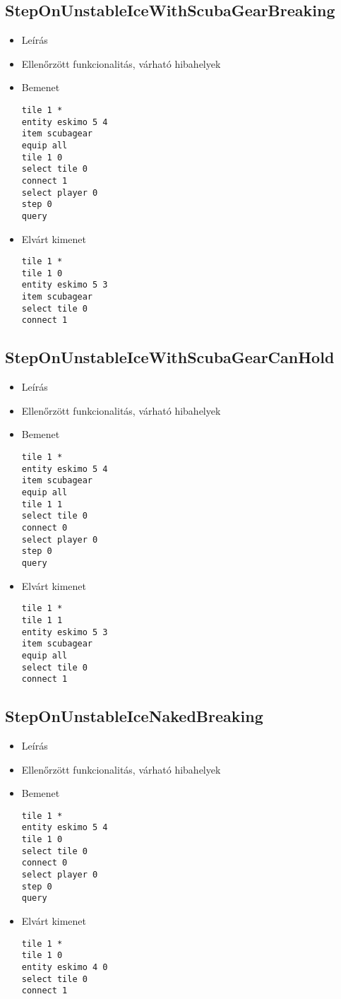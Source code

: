 \subsection{StepOnUnstableIceWithScubaGearBreaking}
\begin{itemize}
\item Leírás\newline
\item Ellenőrzött funkcionalitás, várható hibahelyek
\item Bemenet
\begin{lstlisting}
tile 1 *
entity eskimo 5 4
item scubagear
equip all
tile 1 0
select tile 0
connect 1
select player 0
step 0
query
\end{lstlisting}
\item Elvárt kimenet
\begin{lstlisting}
tile 1 *
tile 1 0
entity eskimo 5 3
item scubagear
select tile 0
connect 1
\end{lstlisting}
\end{itemize}

\subsection{StepOnUnstableIceWithScubaGearCanHold}
\begin{itemize}
\item Leírás\newline
\item Ellenőrzött funkcionalitás, várható hibahelyek
\item Bemenet
\begin{lstlisting}
tile 1 *
entity eskimo 5 4
item scubagear
equip all
tile 1 1
select tile 0
connect 0
select player 0
step 0
query
\end{lstlisting}
\item Elvárt kimenet
\begin{lstlisting}
tile 1 *
tile 1 1
entity eskimo 5 3
item scubagear
equip all
select tile 0
connect 1
\end{lstlisting}
\end{itemize}

\subsection{StepOnUnstableIceNakedBreaking}
\begin{itemize}
\item Leírás\newline
\item Ellenőrzött funkcionalitás, várható hibahelyek
\item Bemenet
\begin{lstlisting}
tile 1 *
entity eskimo 5 4
tile 1 0
select tile 0
connect 0
select player 0
step 0
query
\end{lstlisting}
\item Elvárt kimenet
\begin{lstlisting}
tile 1 *
tile 1 0
entity eskimo 4 0
select tile 0
connect 1
\end{lstlisting}
\end{itemize}

